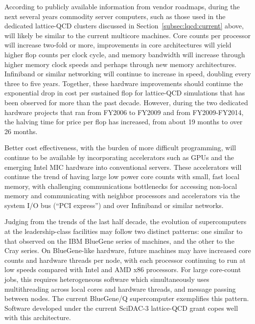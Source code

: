 According to publicly available information from vendor roadmaps, during the
next several years commodity server computers, such as those used in the
dedicated lattice-QCD clusters discussed in Section~\ref{subsec:lqcd:current}
above, will likely be similar to the current multicore machines.  Core counts
per processor will increase two-fold or more, improvements in core
architectures will yield higher flop counts per clock cycle, and memory
bandwidth will increase through higher memory clock speeds and perhaps through
new memory architectures.  Infiniband or similar networking will continue to
increase in speed, doubling every three to five years.  Together, these
hardware improvements should continue the exponential drop in cost per
sustained flop for lattice-QCD simulations that has been observed for more
than the past decade.  However, during the two dedicated hardware projects
that ran from FY2006 to FY2009 and from FY2009-FY2014, the halving time for
price per flop has increased, from about 19 months to over 26 months.

Better cost effectiveness, with the burden of more difficult programming, will
continue to be available by incorporating accelerators such as GPUs and the
emerging Intel MIC hardware into conventional servers.  These accelerators
will continue the trend of having large low power core counts with small, fast
local memory, with challenging communications bottlenecks for accessing
non-local memory and communicating with neighbor processors and accelerators
via the system I/O bus (``PCI express'') and over Infiniband or similar
networks.  
 
Judging from the trends of the last half decade, the evolution of
supercomputers at the leadership-class facilities may follow two distinct
patterns: one similar to that observed on the IBM BlueGene series of machines,
and the other to the Cray series.  On BlueGene-like hardware, future machines
may have increased core counts and hardware threads per node, with each
processor continuing to run at low speeds compared with Intel and AMD x86
processors.  For large core-count jobs, this requires heterogeneous software
which simultaneously uses multithreading across local cores and hardware
threads, and message passing between nodes.    The current BlueGene/Q
supercomputer exemplifies this pattern.  Software developed under the
current SciDAC-3 lattice-QCD grant copes well with this architecture.

